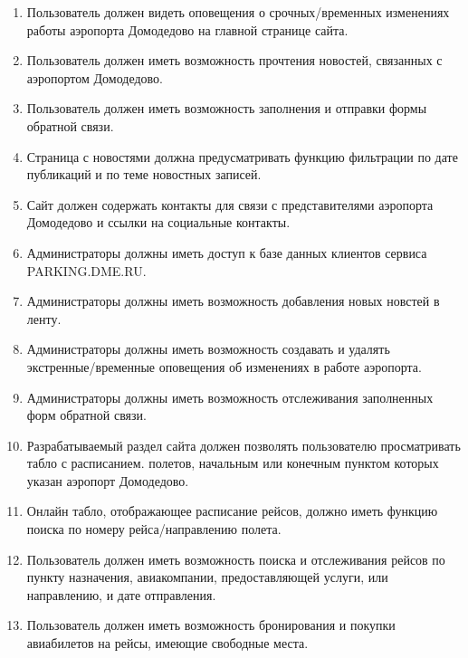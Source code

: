 \begin{enumerate}
    \item Пользователь должен видеть оповещения о срочных/временных изменениях работы аэропорта
    Домодедово на главной странице сайта.

    \item Пользователь должен иметь возможность прочтения новостей, связанных с аэропортом
    Домодедово.

    \item Пользователь должен иметь возможность заполнения и отправки формы обратной связи.
    
    \item Страница с новостями должна предусматривать функцию фильтрации по дате публикаций
    и по теме новостных записей.

    \item Сайт должен содержать контакты для связи с представителями аэропорта Домодедово и ссылки на социальные контакты.
    
    \item Администраторы должны иметь доступ к базе данных клиентов сервиса PARKING.DME.RU.
    
    \item Администраторы должны иметь возможность добавления новых новстей в ленту.
    
    \item Администраторы должны иметь возможность создавать и удалять экстренные/временные оповещения об изменениях в работе аэропорта.
    
    \item Администраторы должны иметь возможность отслеживания заполненных форм обратной связи.
    
    \item Разрабатываемый раздел сайта должен позволять пользователю просматривать табло с расписанием.
    полетов, начальным или конечным пунктом которых указан аэропорт Домодедово.

    \item Онлайн табло, отображающее расписание рейсов, должно иметь функцию
    поиска по номеру рейса/направлению полета.

    \item Пользователь должен иметь возможность поиска и отслеживания рейсов по пункту назначения, 
    авиакомпании, предоставляющей услуги, или направлению, и дате отправления.

    \item Пользователь должен иметь возможность бронирования и покупки авиабилетов
    на рейсы, имеющие свободные места.


\end{enumerate}
